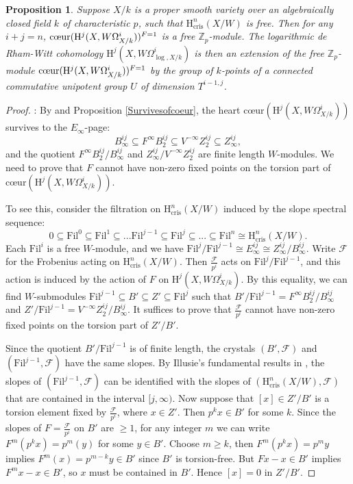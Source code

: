 \documentclass[a4paper,12pt,twoside]{report}
\newtheorem{proposition}[theorem]{Proposition}
\newcommand{\Z}{\mathbb{Z}}
\newcommand{\cris}{\mathrm{cris}}
\newcommand{\HH}{\mathrm{H}}
\newcommand{\Fil}{\mathrm{Fil}}
\begin{document}
\begin{proposition}\label{AbeT}
    Suppose $X/k$ is a proper smooth variety over an algebraically closed field $k$ of characteristic $p$, 
    such that $\HH^n_{\cris}(X/W)$ is free. Then for any $i+j=n$, 
    $\text{\rm{c\oe ur}}(\HH^j(X,W\Omega^i_{X/k}))^{F=1}$
    is a free $\Z_p$-module. 
    The logarithmic de Rham-Witt cohomology $\HH^j(X,W\Omega^i_{\log,X/k})$ 
    is then an extension of the free $\Z_p$-module $\text{\rm{c\oe ur}}(\HH^j(X,W\Omega^i_{X/k}))^{F=1}$ 
    by the group of $k$-points of a connected commutative unipotent group $U$ of dimension $T^{i-1,j}$.
\end{proposition}
\begin{proof}: By \cite[Theorem II.3.4]{IR} and Proposition \ref{Survivesofcoeur}, the heart $\text{c\oe ur}(\HH^j(X,W\Omega^i_{X/k}))$ 
survives to the $E_{\infty}$-page: 
\begin{equation*}
    B_{\infty}^{ij}\subseteq F^{\infty}B_2^{ij} \subseteq V^{-\infty}Z_2^{ij}\subseteq Z_{\infty}^{ij},
\end{equation*} and the quotient $ F^{\infty}B_2^{ij}/B_{\infty}^{ij}$ and $Z_{\infty}^{ij}/ V^{-\infty}Z_2^{ij}$ are finite length $W$-modules. 
We need to prove that $F$ cannot have non-zero
fixed points on the torsion part of $\text{c\oe ur}(\HH^j(X,W\Omega^i_{X/k}))$.  

To see this, consider the filtration on $\HH^n_{\cris}(X/W)$ induced by the slope spectral sequence: 
\[0\subseteq \Fil^0\subseteq \Fil^1 \subseteq ...\Fil^{j-1} \subseteq \Fil^j \subseteq ...\subseteq \Fil^n \cong \HH^n_{\cris}(X/W).\]
Each $\Fil^i$ is a free $W$-module, and we have 
$\Fil^j/\Fil^{j-1}\cong E_{\infty}^{ij}\cong Z_{\infty}^{ij}/B_{\infty}^{ij}$. 
Write $\mathcal{F}$ for the Frobenius acting on $\HH^n_{\cris}(X/W)$.
Then $\frac{\mathcal{F}}{p^i}$ acts on $\Fil^j/\Fil^{j-1}$, and this action is induced by 
the action of $F$ on $\HH^j(X,W\Omega^i_{X/k})$. 
By this equality, we can find $W$-submodules 
$\Fil^{j-1} \subseteq B'\subseteq Z'\subseteq \Fil^j$ such that 
$B'/\Fil^{j-1}=F^{\infty}B_2^{ij}/B_{\infty}^{ij}$ and $Z'/\Fil^{j-1}=V^{-\infty}Z_2^{ij}/B_{\infty}^{ij}$. 
It suffices to prove that $\frac{\mathcal{F}}{p^i}$ cannot have non-zero fixed points on the torsion part of $Z'/B'$. 

Since the quotient $B'/\Fil^{j-1}$ is of finite length, 
the crystals $(B',\mathcal{F})$ and $(\Fil^{j-1},\mathcal{F})$ have the same slopes. 
By Illusie's fundamental results in \cite{Il1}, 
the slopes of $(\Fil^{j-1},\mathcal{F})$ 
can be identified with the slopes of $(\HH_{\cris}^n(X/W),\mathcal{F})$ that are
contained in the interval $[j,\infty)$. 
Now suppose that $[x]\in Z'/B'$ is a torsion element fixed by $\frac{\mathcal{F}}{p^i}$, 
where $x\in Z'$. Then $p^kx\in B'$ for some $k$. 
Since the slopes of $F=\frac{\mathcal{F}}{p^i}$ on $B'$ are $\geqslant 1$, 
for any integer $m$ we can write $F^m(p^kx)=p^m(y)$ for some $y\in B'$. 
Choose $m\geqslant k$, then $F^m(p^kx)=p^my$ implies $F^m(x)=p^{m-k}y\in B'$
since $B'$ is torsion-free.
But $Fx-x\in B'$ implies $F^{m}x-x\in B'$, so $x$ must be contained in $B'$. 
Hence $[x]=0$ in $Z'/B'$. \end{proof}
\medskip
\end{document}
